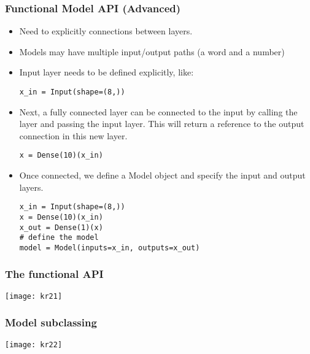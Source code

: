 \begin{frame}[fragile] \frametitle{Functional Model API (Advanced)}

\begin{itemize}
\item Need to explicitly connections between layers.
\item Models may have multiple input/output paths (a word and a number)
\item Input layer needs to be defined explicitly, like:
\begin{lstlisting}
x_in = Input(shape=(8,))
\end{lstlisting}

\item Next, a fully connected layer can be connected to the input by calling the layer and passing the input layer. This will return a reference to the output connection in this new layer.
\begin{lstlisting}
x = Dense(10)(x_in)
\end{lstlisting}

\item Once connected, we define a Model object and specify the input and output layers.
\begin{lstlisting}
x_in = Input(shape=(8,))
x = Dense(10)(x_in)
x_out = Dense(1)(x)
# define the model
model = Model(inputs=x_in, outputs=x_out)
\end{lstlisting}
\end{itemize}
\end{frame}


\begin{frame}[fragile] \frametitle{The functional API}
\begin{center}
\texttt{[image: kr21]}
\end{center}
\end{frame}

\begin{frame}[fragile] \frametitle{Model subclassing}
\begin{center}
\texttt{[image: kr22]}
\end{center}
\end{frame}


